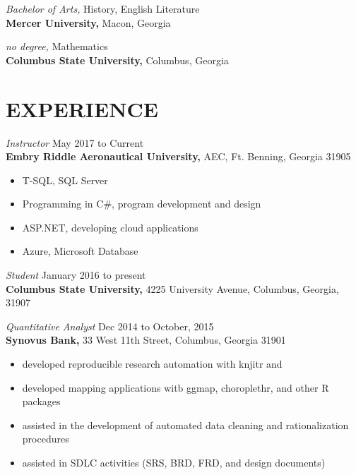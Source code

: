 \documentclass[margin, 10pt]{res} %
\begin{document}
\begin{resume}
{\it Bachelor of Arts,} History, English Literature\\
\textbf{Mercer University,} Macon, Georgia

{\it no degree,} Mathematics\\
\textbf{Columbus State University,} Columbus, Georgia

 
\section{EXPERIENCE}
 
%

{\it Instructor} \hfill May 2017 to Current \\
\textbf{Embry Riddle Aeronautical University,} AEC, Ft. Benning, Georgia 31905

\begin{itemize} \itemsep -2pt %
\item T-SQL, SQL Server
\item Programming in C\#, program development and design
\item ASP.NET, developing cloud applications
\item Azure, Microsoft Database
\end{itemize}
 
{\it Student} \hfill January 2016 to present \\
\textbf{Columbus State University,} 4225 University Avenue, Columbus, Georgia, 31907

{\it Quantitative Analyst} \hfill Dec 2014 to October, 2015 \\
\textbf{Synovus Bank,} 33 West 11th Street, Columbus, Georgia 31901

\begin{itemize} \itemsep -2pt %
\item developed reproducible research automation with knjitr and \LaTeXe
\item developed mapping applications witb ggmap, choroplethr, and other \textsf{R} packages
\item assisted in the development of automated data cleaning and rationalization procedures
\item assisted in SDLC activities (SRS, BRD, FRD, and design documents)
\end{itemize}
 

\end{resume}
\end{document}
